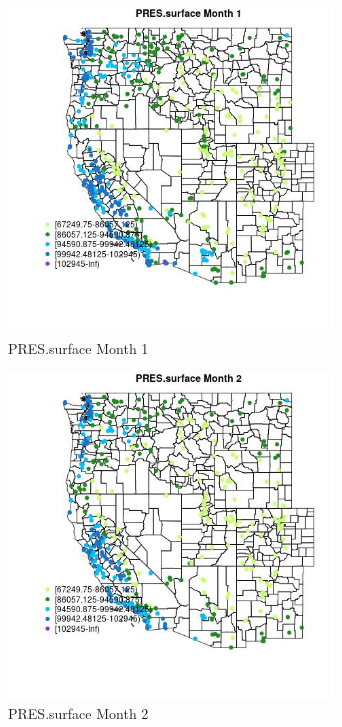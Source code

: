\begin{figure} 
\centering  
\includegraphics[width=0.77\textwidth]{Code_Outputs/Report_ML_input_PM25_Step4_part_e_de_duplicated_aves_compiled_2019-05-18wNAs_MapObsMo1PRESsurface.jpg} 
\caption{\label{fig:Report_ML_input_PM25_Step4_part_e_de_duplicated_aves_compiled_2019-05-18wNAsMapObsMo1PRESsurface}PRES.surface Month 1} 
\end{figure} 
 

\begin{figure} 
\centering  
\includegraphics[width=0.77\textwidth]{Code_Outputs/Report_ML_input_PM25_Step4_part_e_de_duplicated_aves_compiled_2019-05-18wNAs_MapObsMo2PRESsurface.jpg} 
\caption{\label{fig:Report_ML_input_PM25_Step4_part_e_de_duplicated_aves_compiled_2019-05-18wNAsMapObsMo2PRESsurface}PRES.surface Month 2} 
\end{figure} 
 

